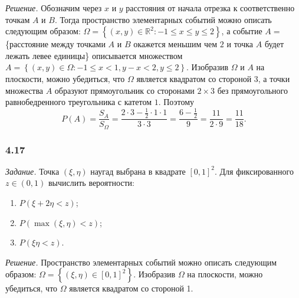 \textit{Решение.} Обозначим через $x$ и $y$ расстояния от начала отрезка к соответственно точкам $A$ и $B$.
Тогда пространство элементарных событий можно описать следующим образом:
$ \Omega =
\left\{ \left( x, y \right) \in \mathbb{R}^2: -1 \leq x \leq y \leq 2 \right\}$,
а событие $A = $ \{расстояние между точками $A$ и $B$ окажется меньшим чем $2$ и точка $A$ будет лежать левее единицы\}
описывается множеством $A = \left\{ \left( x, y \right) \in \Omega: -1 \leq x < 1, y - x < 2, y \leq 2 \right\}$.
Изобразив $ \Omega $ и $A$ на плоскости, можно убедиться, что $ \Omega $ является квадратом со стороной $3$,
а точки множества $A$ образуют прямоугольник со сторонами $2 \times 3$ без прямоугольного равнобедренного треугольника с катетом $1$.
Поэтому
$$P \left( A \right) =
\frac{S_A}{S_{ \Omega }} =
\frac{2 \cdot 3 - \frac{1}{2} \cdot 1 \cdot 1}{3 \cdot 3} =
\frac{6 - \frac{1}{2} }{9} =
\frac{11}{2 \cdot 9} =
\frac{11}{18}.$$

\subsubsection*{4.17}

\textit{Задание.} Точка $ \left( \xi, \eta \right) $ наугад выбрана в квадрате $ \left[ 0, 1 \right]^2$.
Для фиксированного $z \in \left( 0, 1 \right) $ вычислить вероятности:
\begin{enumerate}[label=\alph*)]
\item $P \left( \xi + 2 \eta < z \right) $;
\item $P \left( \max \left( \xi, \eta \right) < z \right) $;
\item $P \left( \xi \eta < z \right) $.
\end{enumerate}

\textit{Решение.} Пространство элементарных событий можно описать следующим образом:
$ \Omega =
\left\{ \left( \xi, \eta \right) \in \left[ 0, 1 \right]^2 \right\}$.
Изобразив $ \Omega $ на плоскости, можно убедиться, что $ \Omega $ является квадратом со стороной 1.

